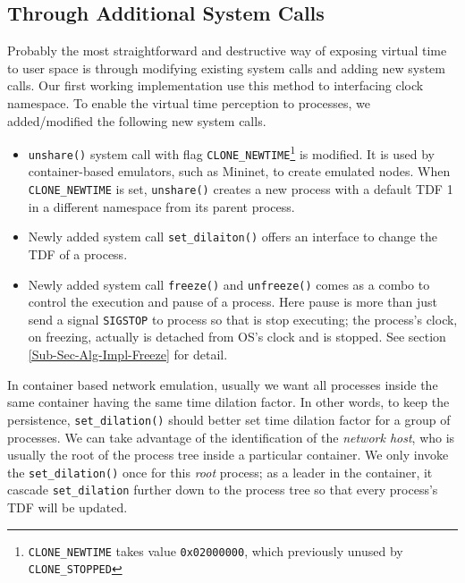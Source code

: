 \documentclass{acm_proc_article-sp}
\begin{document}
\subsection{Through Additional System Calls}
Probably the most straightforward and destructive way of exposing virtual time to user space is through modifying existing system calls and adding new system calls. 
Our first working implementation use this method to interfacing clock namespace\cite{yan:vts:pads15, yan:vtmininet:sosr15}.
To enable the virtual time perception to processes, we added/modified the following new system calls.
\begin{itemize}
\item \texttt{unshare()} system call with flag \texttt{CLONE\_NEWTIME}\footnote{\texttt{CLONE\_NEWTIME} takes value \texttt{0x02000000}, which previously unused by \texttt{CLONE\_STOPPED}} is modified. 
It is used by container-based emulators, such as Mininet, to create emulated nodes. 
When \texttt{CLONE\_NEWTIME} is set, \texttt{unshare()} creates a new process with a default TDF 1 in a different namespace from its parent process.
\item Newly added system call \texttt{set\_dilaiton()} offers an interface to change the TDF of a process. 
\item Newly added system call \texttt{freeze()} and \texttt{unfreeze()} comes as a combo to control the execution and pause of a process. 
Here pause is more than just send a signal \texttt{SIGSTOP} to process so that is stop executing; the process's clock, on freezing, actually is detached from OS's clock and is stopped. 
See section \ref{Sub-Sec-Alg-Impl-Freeze} for detail.
\end{itemize}
In container based network emulation, usually we want all processes inside the same container having the same time dilation factor. 
In other words, to keep the persistence, \texttt{set\_dilation()} should better set time dilation factor for a group of processes. 
We can take advantage of the identification of the \textit{network host}, who is usually the root of the process tree inside a particular container. 
We only invoke the \texttt{set\_dilation()} once for this \textit{root} process; as a leader in the container, it cascade \texttt{set\_dilation} further down to the process tree so that every process's TDF will be updated.
\end{document}
